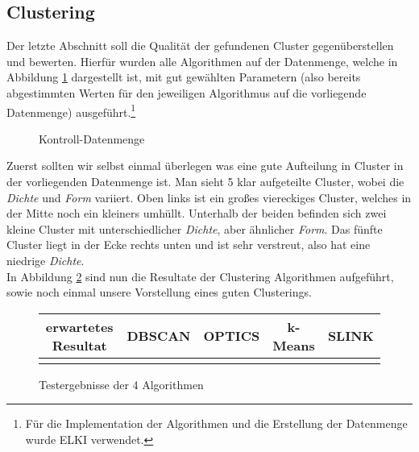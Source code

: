 \documentclass{lni}
\begin{document}

\subsection{Clustering}

Der letzte Abschnitt soll die Qualität der gefundenen Cluster gegenüberstellen und bewerten. Hierfür wurden alle Algorithmen auf der Datenmenge, welche in Abbildung \ref{fig:5} dargestellt ist, mit gut gewählten Parametern (also bereits abgestimmten Werten für den jeweiligen Algorithmus auf die vorliegende Datenmenge) ausgeführt.\footnote{Für die Implementation der Algorithmen und die Erstellung der Datenmenge wurde ELKI\cite{ELKI} verwendet.}

\begin{figure}[hb]
    \centering
    
    \caption{Kontroll-Datenmenge}
    \label{fig:5}
\end{figure}

Zuerst sollten wir selbst einmal überlegen was eine \glqq gute\grqq{} Aufteilung in Cluster in der vorliegenden Datenmenge ist. Man sieht 5 klar aufgeteilte Cluster, wobei die \textit{Dichte} und \textit{Form} variiert. Oben links ist ein großes viereckiges Cluster, welches in der Mitte noch ein kleiners umhüllt. Unterhalb der beiden befinden sich zwei kleine Cluster mit unterschiedlicher \textit{Dichte}, aber ähnlicher \textit{Form}. Das fünfte Cluster liegt in der Ecke rechts unten und ist sehr verstreut, also hat eine niedrige \textit{Dichte}.\\
In Abbildung \ref{fig:6} sind nun die Resultate der Clustering Algorithmen aufgeführt, sowie noch einmal unsere Vorstellung eines guten Clusterings.

\begin{figure}
    \centering
    \begin{tabular}{|c|c|c|c|c|}
        \hline
        erwartetes Resultat & DBSCAN & OPTICS & k-Means & SLINK\\
        \hline  
        \raisebox{-\totalheight}{} &
        \raisebox{-\totalheight}{} &
        \raisebox{-\totalheight}{} &
        \raisebox{-\totalheight}{} &
        \raisebox{-\totalheight}{}\\
        \hline
    \end{tabular}
    \caption{Testergebnisse der 4 Algorithmen}
    \label{fig:6}
\end{figure}
\end{document}
